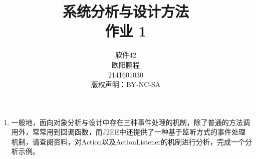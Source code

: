 \documentclass[UTF8]{ctexart}
\title{系统分析与设计方法 \\ 作业 1}
\author{软件42 \\ 欧阳鹏程 \\ 2141601030 \\ 版权声明：BY-NC-SA}
\begin{document}
\maketitle

\begin{enumerate}
	\item{一般地，面向对象分析与设计中存在三种事件处理的机制，除了普通的方法调用外，常常用到回调函数，而J2EE中还提供了一种基于监听方式的事件处理机制，请查阅资料，对Action以及ActionListener的机制进行分析，完成一个分析示例。}
\end{enumerate}

\end{document}
